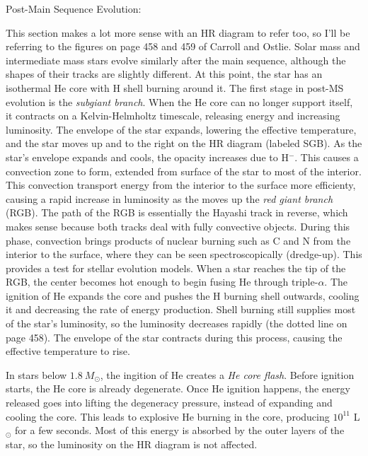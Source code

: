 Post-Main Sequence Evolution:

This section makes a lot more sense with an HR diagram to refer too, so I'll be referring to the 
figures on page 458 and 459 of Carroll and Ostlie.  Solar mass and intermediate mass stars 
evolve similarly after the main sequence, although the shapes of their tracks are slightly 
different.  At this point, the star has an isothermal He core with H shell burning around it.  
The first stage in post-MS evolution is the \emph{subgiant branch}.  When the He core 
can no longer support itself, it contracts on a Kelvin-Helmholtz timescale, releasing energy and 
increasing luminosity.  The envelope of the star expands, lowering the effective temperature, and 
the star moves up and to the right on the HR diagram (labeled SGB).  As the star's envelope 
expands and cools, the opacity increases due to H$^-$.  This causes a convection zone to form, 
extended from surface of the star to most of the interior.  This convection transport energy from 
the interior to the surface more efficienty, causing a rapid increase in luminosity as the moves 
up the \emph{red giant branch} (RGB).  The path of the RGB is essentially the Hayashi track in 
reverse, which makes sense because both tracks deal with fully convective objects.  During this 
phase, convection brings products of nuclear burning such as C and N from the interior to the 
surface, where they can be seen spectroscopically (dredge-up).  This provides a test for stellar 
evolution models.  When a star reaches the tip of the RGB, the center becomes hot enough to begin 
fusing He through triple-$\alpha$.  The ignition of He expands the core and pushes the H burning 
shell outwards, cooling it and decreasing the rate of energy production.  Shell burning still 
supplies most of the star's luminosity, so the luminosity decreases rapidly (the dotted line on 
page 458).  The envelope of the star contracts during this process, causing the effective 
temperature to rise.   

In stars below $1.8\ M_{\odot}$, the ingition of He creates a \emph{He core flash}.  Before 
ignition starts, the He core is already degenerate.  Once He ignition happens, the energy released 
goes into lifting the degeneracy pressure, instead of expanding and cooling the core.  This leads 
to explosive He burning in the core, producing $10^{11}$ L$_{\odot}$ for a few seconds.  Most of 
this energy is absorbed by the outer layers of the star, so the luminosity on the HR diagram is 
not affected.  

